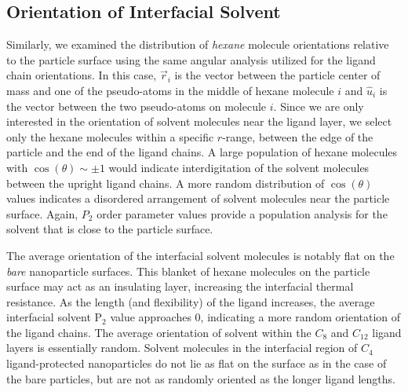 \documentclass[aps,jcp,preprint,showpacs,superscriptaddress,groupedaddress]{revtex4-1}  %
\begin{document}
\subsection{Orientation of Interfacial Solvent}

Similarly, we examined the distribution of \emph{hexane} molecule
orientations relative to the particle surface using the same angular
analysis utilized for the ligand chain orientations. In this case,
$\vec{r}_i$ is the vector between the particle center of mass and one
of the  pseudo-atoms in the middle of hexane molecule $i$ and
$\hat{u}_i$ is the vector between the two  pseudo-atoms on
molecule $i$. Since we are only interested in the orientation of
solvent molecules near the ligand layer, we select only the hexane
molecules within a specific $r$-range, between the edge of the
particle and the end of the ligand chains. A large population of
hexane molecules with $\cos{(\theta)} \sim \pm 1$ would indicate
interdigitation of the solvent molecules between the upright ligand
chains. A more random distribution of $\cos{(\theta)}$ values
indicates a disordered arrangement of solvent molecules near the particle
surface. Again, $P_2$ order parameter values provide a population
analysis for the solvent that is close to the particle surface.

The average orientation of the interfacial solvent molecules is
notably flat on the \emph{bare} nanoparticle surfaces. This blanket of
hexane molecules on the particle surface may act as an insulating
layer, increasing the interfacial thermal resistance. As the length
(and flexibility) of the ligand increases, the average interfacial
solvent P$_2$ value approaches 0, indicating a more random orientation
of the ligand chains. The average orientation of solvent within the
$C_8$ and $C_{12}$ ligand layers is essentially random. Solvent
molecules in the interfacial region of $C_4$ ligand-protected
nanoparticles do not lie as flat on the surface as in the case of the
bare particles, but are not as randomly oriented as the longer ligand
lengths.
\end{document}
